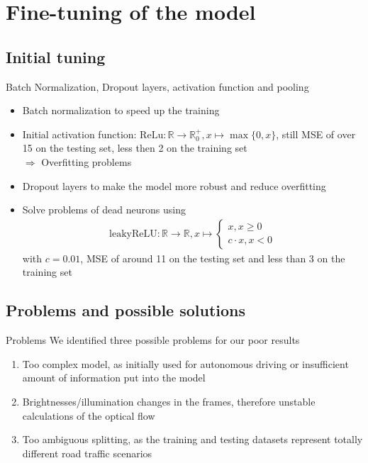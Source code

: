 \section{Fine-tuning of the model}
\subsection{Initial tuning}

\begin{frame}{Batch Normalization, Dropout layers, activation function and pooling}
\begin{itemize}
\item Batch normalization to speed up the training \cite{BatchNorm2015}
\item Initial activation function: $\mathrm{ReLu}: \mathbb{R} \to \mathbb{R}_0^+, x \mapsto \max\{0,x\}$, still MSE of over 15 on the testing 
set, less then 2 on the training set\\
$\Rightarrow$ Overfitting problems
\item Dropout layers \cite{Dropout2014} to make the model more robust and reduce overfitting
\item Solve problems of dead neurons using
\begin{align*}
\mathrm{leakyReLU} : \mathbb{R} \to \mathbb{R}, x \mapsto \begin{cases}
x, x \geq 0\\
c \cdot x, x <0
\end{cases}
\end{align*}
with $c = 0.01$, MSE of around 11 on the testing set and less than 3 on the training set
\end{itemize}
\end{frame}
\subsection{Problems and possible solutions}
\begin{frame}{Problems}
We identified three possible problems for our poor results
\begin{enumerate}
\item Too complex model, as initially used for autonomous driving or insufficient amount of information put into the model
\item Brightnesses/illumination changes in the frames, therefore unstable calculations of the optical flow
\item Too ambiguous splitting, as the training and testing datasets represent totally different road traffic scenarios
\end{enumerate}
\end{frame}

